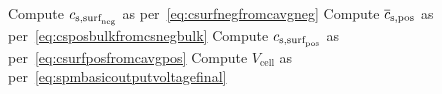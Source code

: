 \begin{algorithm}[!htbp]
\begin{algorithmic}[1]
            \State Compute $c_{{\text{s,surf}_\text{neg}}}$ as per~\cref{eq:csurfnegfromcavgneg}
            \State Compute $\overline{c}_{\text{s,pos}}$ as per~\cref{eq:csposbulkfromcsnegbulk}
            \State Compute $c_{{\text{s,surf}_\text{pos}}}$ as per~\cref{eq:csurfposfromcavgpos}
            \State Compute $V_\text{cell}$ as per~\cref{eq:spmbasicoutputvoltagefinal}
        \EndOutputEqn%
    \end{algorithmic}
\end{algorithm}
